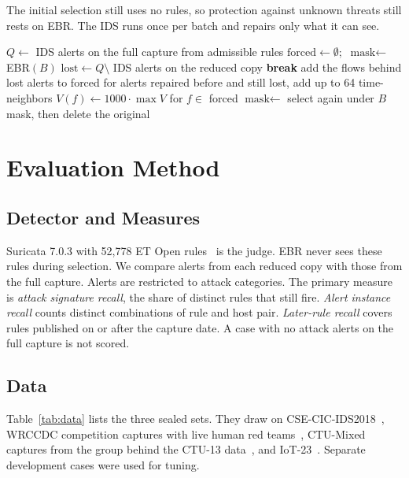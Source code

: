 \documentclass[conference]{IEEEtran}
\begin{document}
The initial selection still uses no rules, so protection against unknown threats still rests on EBR. The IDS runs once per batch and repairs only what it can see.

\begin{algorithm}[t]
\caption{Verify Before Delete}
\label{alg:verify}
\footnotesize
\begin{algorithmic}[1]
\State $Q\gets$ IDS alerts on the full capture from admissible rules
\State $\text{forced}\gets\emptyset$;\ $\text{mask}\gets$ EBR$(B)$
  \State $\text{lost}\gets Q\setminus$ IDS alerts on the reduced copy
   \textbf{break} \EndIf
  \State add the flows behind lost alerts to forced
  \State for alerts repaired before and still lost, add up to 64 time-neighbors
  \State $V(f)\gets 1000\cdot\max V$ for $f\in$ forced
  \State $\text{mask}\gets$ select again under $B$
\EndFor
\State \Return mask, then delete the original
\end{algorithmic}
\end{algorithm}

\section{Evaluation Method}
\subsection{Detector and Measures}
Suricata 7.0.3 with 52,778 ET Open rules~\cite{suricata,etopen} is the judge. EBR never sees these rules during selection. We compare alerts from each reduced copy with those from the full capture. Alerts are restricted to attack categories. The primary measure is \emph{attack signature recall}, the share of distinct rules that still fire. \emph{Alert instance recall} counts distinct combinations of rule and host pair. \emph{Later-rule recall} covers rules published on or after the capture date. A case with no attack alerts on the full capture is not scored.

\subsection{Data}
Table~\ref{tab:data} lists the three sealed sets. They draw on CSE-CIC-IDS2018~\cite{cic}, WRCCDC competition captures with live human red teams~\cite{wrccdc}, CTU-Mixed captures from the group behind the CTU-13 data~\cite{ctu}, and IoT-23~\cite{iot23}. Separate development cases were used for tuning.
\end{document}
